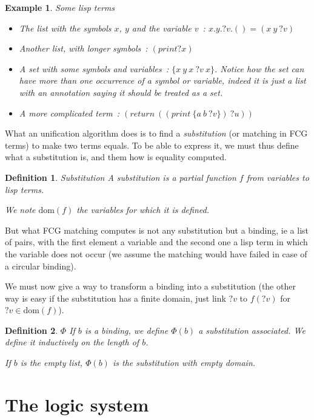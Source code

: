 \documentclass[]{article}
\newcommand{\1}{\mathbbm{1}}
\newcommand{\0}{\mathbbm{0}}
\newtheorem{defi}{Definition}
\newtheorem{ex}{Example}
\begin{document}
\begin{ex}{Some lisp terms}\begin{itemize}
    \item The list with the symbols $x$, $y$ and the variable $v$~:
        $x.y.?v.() = (x\ y\ ?v)$
    \item Another list, with longer symbols~: $(print ?x)$
    \item A set with some symbols and variables~: $\{x\ y\ x\ ?v\ x\}$. Notice
        how the set can have more than one occurrence of a symbol or variable, indeed
        it is just a list with an annotation saying it should be treated as a set.
    \item A more complicated term~: $(return\ ((print\ \{a\ b\ ?v\})\ ?u))$
\end{itemize}\end{ex}

What an unification algorithm does is to find a \emph{substitution} (or matching in
FCG terms) to make two terms equals. To be able to express it, we must thus define
what a substitution is, and them how is equality computed.

\begin{defi}{Substitution}
    A substitution is a partial function $f$ from variables to lisp terms.

    We note $\text{dom}(f)$ the variables for which it is defined.
\end{defi}

But what FCG matching computes is not any substitution but a binding, ie a list
of pairs, with the first element a variable and the second one a lisp term in which
the variable does not occur (we assume the matching would have failed in case of
a circular binding).

We must now give a way to transform a binding into a substitution (the other way is
easy if the substitution has a finite domain, just link $?v$ to $f(?v)$ for
$?v\in\text{dom}(f)$).

\begin{defi}{$\Phi$}
    If $b$ is a binding, we define $\Phi(b)$ a substitution associated. We define
    it inductively on the length of $b$.

    If $b$ is the empty list, $\Phi(b)$ is the substitution with empty domain.
\end{defi}

\section{The logic system}
\end{document}
